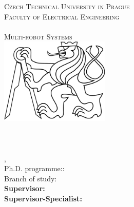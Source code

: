 
\begin{titlepage}
  \begin{center}

    \textsc{\Large Czech Technical University in Prague}\\[1em]
    \textsc{\large Faculty of Electrical Engineering\\
    \Department\\
    Multi-robot Systems\\[3em]
    }
    \includegraphics[height=4.1cm]{fig/ctu_lion.pdf}\\[3em]

    \textbf{\textsc{\Huge \Title}}\\[2em]

    \textbf{\Large \DocName}\\[6em]

    \textbf{\huge \Author}\\[6em]

    {\large \Location, \Date}\\[3em]

    Ph.D. programme:: \Programme\\
    Branch of study: \Field\\[2em]

    \textbf{Supervisor: \Supervisor}\\
    \textbf{Supervisor-Specialist: \SupervisorSpecialist}

    \vspace{2pt}

  \end{center}
\end{titlepage}
